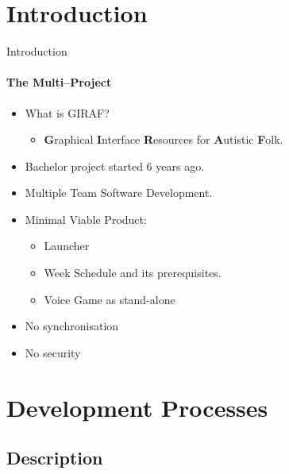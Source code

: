 \section{Introduction}
    \begin{frame}[t]{Introduction}\framesubtitle{The Multi--Project}
        \begin{itemize}
	        \item What is GIRAF?
	        	\begin{itemize}
	        		\item \textbf{G}raphical \textbf{I}nterface \textbf{R}esources for \textbf{A}utistic \textbf{F}olk.
	        	\end{itemize}
        	\item Bachelor project started 6 years ago.
        	\item Multiple Team Software Development.
        	\item Minimal Viable Product:
        		\begin{itemize}
        			\item Launcher 
        			\item Week Schedule and its prerequisites.
        			\item Voice Game as stand-alone
        		\end{itemize}
    			\item No synchronisation
    			\item No security
    		\end{itemize}
    \end{frame}

\section{Development Processes}
	\subsection{Description}
